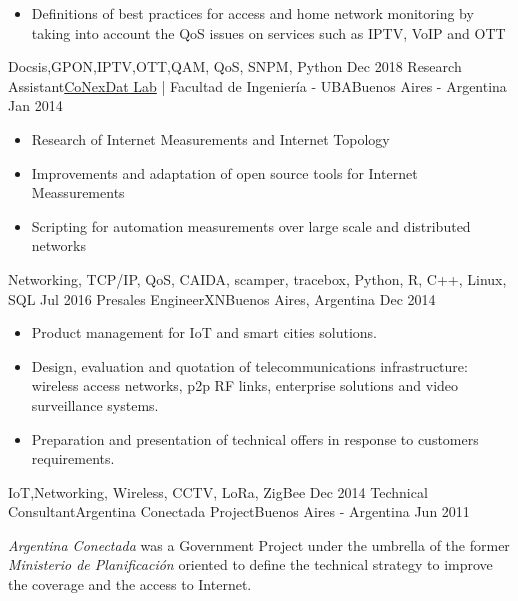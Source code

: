 \begin{experiences}
{\begin{itemize}
                      \item Definitions of best practices for access  and home network monitoring by taking into account the QoS issues on services such as IPTV, VoIP and OTT
                      \end{itemize}
                    }
                    {Docsis,GPON,IPTV,OTT,QAM, QoS, SNPM, Python}
  \emptySeparator
  \experience
    {Dec 2018}     {Research Assistant}{\href{https://cnet.fi.uba.ar/en/}{\color{accentcolor}CoNexDat Lab} | Facultad de Ingeniería - UBA}{Buenos Aires - Argentina}
    {Jan 2014}    {
                      \begin{itemize}
                        \item Research of Internet Measurements and Internet Topology
                        \item Improvements and adaptation of open source tools for Internet Meassurements
                        \item Scripting for automation measurements over large scale and distributed networks
                      \end{itemize}
                    }
                    {Networking, TCP/IP, QoS, CAIDA, scamper, tracebox, Python, R, C++, Linux, SQL}
  \emptySeparator
  \experience
  {Jul 2016}       {Presales Engineer}{XN}{Buenos Aires, Argentina}
  {Dec 2014}   {
                      \begin{itemize}
                      \item Product management for IoT  and smart cities solutions.
                      \item Design, evaluation and quotation of telecommunications infrastructure: wireless access networks, p2p RF links, enterprise solutions and video surveillance systems.
                      \item Preparation and presentation of technical offers in response to customers requirements.
                      \end{itemize}
                    }
                    {IoT,Networking, Wireless, CCTV, LoRa, ZigBee}
  \emptySeparator         
  \experience
  {Dec 2014}  {Technical Consultant}{Argentina Conectada Project}{Buenos Aires - Argentina}
  {Jun 2011}   {
                      \emph{Argentina Conectada} was a Government Project under the umbrella of the former \emph{Ministerio de Planificación} oriented to define the technical strategy to improve the coverage and the access to Internet.
                      \begin{itemize}

\end{itemize}}
\end{experiences}
